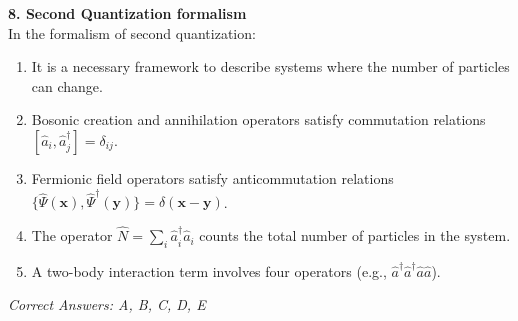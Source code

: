 \documentclass[a4paper,11pt]{article}
\begin{document}
\vspace{0.5cm}

\noindent\textbf{8. Second Quantization formalism}\\
In the formalism of second quantization:

\begin{enumerate}[label=\Alph*.]
    \item It is a necessary framework to describe systems where the number of particles can change.
    \item Bosonic creation and annihilation operators satisfy commutation relations $[\hat{a}_i, \hat{a}_j^\dagger] = \delta_{ij}$.
    \item Fermionic field operators satisfy anticommutation relations $\{\hat{\Psi}(\mathbf{x}), \hat{\Psi}^\dagger(\mathbf{y})\} = \delta(\mathbf{x}-\mathbf{y})$.
    \item The operator $\hat{N} = \sum_i \hat{a}_i^\dagger \hat{a}_i$ counts the total number of particles in the system.
    \item A two-body interaction term involves four operators (e.g., $\hat{a}^\dagger \hat{a}^\dagger \hat{a} \hat{a}$).
\end{enumerate}
\textit{Correct Answers: A, B, C, D, E}
\end{document}
